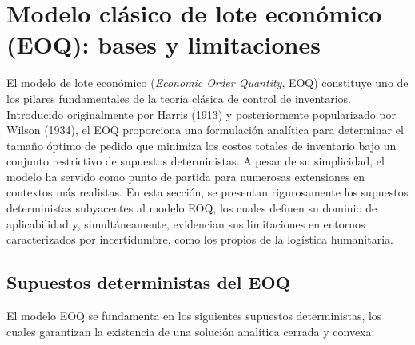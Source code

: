 \documentclass[
  spanish,
  us-letterpaper,
  DIV=11,
  numbers=noendperiod]{scrreprt}
\numberwithin{equation}{section}
\begin{document}
\section{Modelo clásico de lote económico (EOQ): bases y
limitaciones}\label{modelo-cluxe1sico-de-lote-econuxf3mico-eoq-bases-y-limitaciones}

El modelo de lote económico (\emph{Economic Order Quantity}, EOQ)
constituye uno de los pilares fundamentales de la teoría clásica de
control de inventarios. Introducido originalmente por Harris (1913) y
posteriormente popularizado por Wilson (1934), el EOQ proporciona una
formulación analítica para determinar el tamaño óptimo de pedido que
minimiza los costos totales de inventario bajo un conjunto restrictivo
de supuestos deterministas. A pesar de su simplicidad, el modelo ha
servido como punto de partida para numerosas extensiones en contextos
más realistas. En esta sección, se presentan rigurosamente los supuestos
deterministas subyacentes al modelo EOQ, los cuales definen su dominio
de aplicabilidad y, simultáneamente, evidencian sus limitaciones en
entornos caracterizados por incertidumbre, como los propios de la
logística humanitaria.

\subsection{Supuestos deterministas del
EOQ}\label{supuestos-deterministas-del-eoq}

El modelo EOQ se fundamenta en los siguientes supuestos deterministas,
los cuales garantizan la existencia de una solución analítica cerrada y
convexa:
\end{document}
